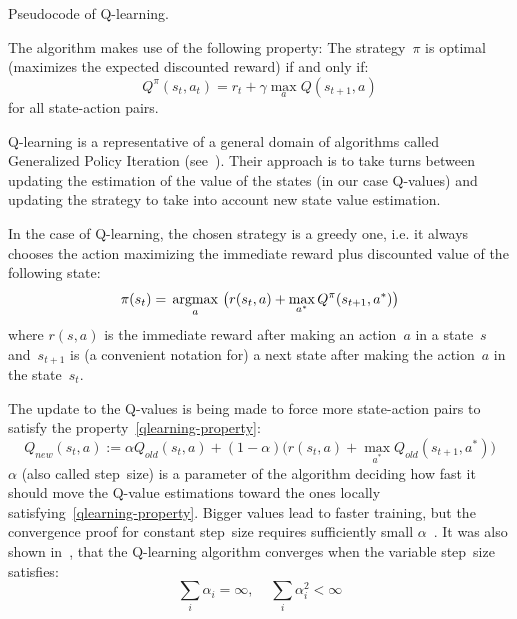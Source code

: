 \begin{algorithm} \label{qlearning-pseudo}
  \caption{Pseudocode of Q-learning.}
\end{algorithm}

The algorithm makes use of the following property:
The strategy~$\pi$ is optimal (maximizes the expected discounted reward) if and only if:
\begin{equation}\label{qlearning-property}
  Q^\pi(s_t, a_t) = r_t + \gamma \max_a Q(s_{t+1}, a)
\end{equation}
for all state-action pairs.

Q-learning is a representative of a general domain of algorithms called Generalized Policy Iteration (see~\cite[Chapter~4.6.]{reinforcement-book}). Their approach is to take turns between updating the estimation of the value of the states (in our case Q-values) and updating the strategy to take into account new state value estimation.
 
In the case of Q-learning, the chosen strategy is a greedy one, i.e. it always chooses the action maximizing the immediate reward plus discounted value of the following state:
\begin{equation}
  \pi(s_t) = \operatorname*{\,\operatorname{argmax}\,}_a \big(r(s_t, a) + \max_{a^*} Q^\pi(s_{t+1}, a^*)\big)
\end{equation}
where $r(s, a)$ is the immediate reward after making an action~$a$ in a state~$s$ and~$s_{t+1}$ is (a convenient notation for) a next state after making the action~$a$ in the state~$s_t$.

The update to the Q-values is being made to force more state-action pairs to satisfy the property~\eqref{qlearning-property}:
\begin{equation}
  Q_{new}(s_t, a) := \alpha Q_{old}(s_t, a) + (1 - \alpha)\big(r(s_t, a) + \max_{a^*} Q_{old}(s_{t+1}, a^*)\big)
\end{equation}
$\alpha$ (also called step~size) is a parameter of the algorithm deciding how fast it should move the Q-value estimations toward the ones locally satisfying~\eqref{qlearning-property}. Bigger values lead to faster training, but the convergence proof for constant step~size requires sufficiently small $\alpha$~\cite[section~3.]{qlearning-old}. It was also shown in~\cite{qlearning-convergence}, that the Q-learning algorithm converges when the variable step~size satisfies:
\begin{equation}
  \sum_i \alpha_i = \infty, \;\;\;\; \sum_i \alpha_i^2 < \infty
\end{equation}



